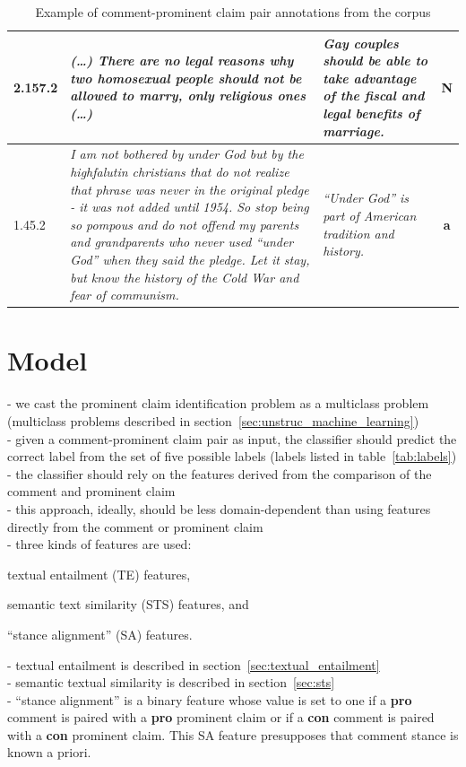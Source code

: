 \begin{table}[t]
{\begin{tabular}{@{}lp{9.5cm}p{3.5cm}c@{}}
\midrule
2.157.2 & \normalsize{%
\textit{
(\dots) There are no legal reasons why two homosexual people should not be
allowed to marry, only religious ones (\dots)
}
} & \normalsize{%
\textit{
Gay couples should be able to take advantage of the fiscal and legal benefits
of marriage.
}
} & \textbf{N} \\
\midrule
1.45.2 & \normalsize{%
\textit{
 I am not bothered by under God but by the highfalutin christians that do not
 realize that phrase was never in the original pledge - it was not added until
 1954. So stop being so pompous and do not offend my parents and grandparents
 who never used ``under God'' when they said the pledge. Let it stay, but know
 the history of the Cold War and fear of communism.
 }} & 
 \normalsize{
 \textit{
 ``Under God'' is part of American tradition and history.
 }} & \textbf{a}  \\
\bottomrule
\end{tabular}
}
\caption{Example of comment-prominent claim pair annotations from the \ComArg corpus}
\label{tab:comarg}
\end{table}


\section{Model}
\label{sec:argrec_model}

- we cast the prominent claim identification problem as a multiclass problem
(multiclass problems described in section~\ref{sec:unstruc_machine_learning}) \\
- given a comment-prominent claim pair as input, the classifier should
predict the correct label from the set of five possible labels (labels
listed in table~\ref{tab:labels}) \\
- the classifier should rely on the features derived from the comparison
of the comment and prominent claim \\
- this approach, ideally, should be less domain-dependent than using features
directly from the comment or prominent claim \\
- three kinds of features are used: \begin{enumerate*}
\item textual entailment (TE) features, 
\item semantic text similarity (STS) features, and
\item ``stance alignment'' (SA) features. 
\end{enumerate*}
- textual entailment is described in section~\ref{sec:textual_entailment} \\
- semantic textual similarity is described in section~\ref{sec:sts} \\
- ``stance alignment'' is a binary feature whose value is set to one if a
\textbf{pro} comment is paired with a \textbf{pro} prominent claim or if a
\textbf{con} comment is paired with a \textbf{con} prominent claim.  This SA
feature presupposes that comment stance is known a priori. \\

